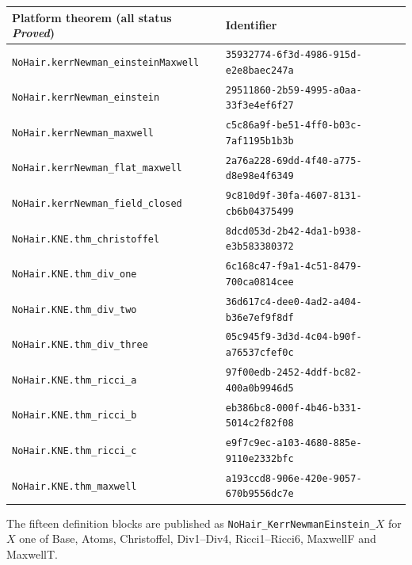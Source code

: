 \documentclass[11pt]{article}
\theoremstyle{definition}
\theoremstyle{remark}
\begin{document}
\begin{center}
\small
\begin{tabular}{@{}ll@{}}
\toprule
Platform theorem (all status \emph{Proved}) & Identifier \\
\midrule
\texttt{NoHair.kerrNewman\_einsteinMaxwell} & \texttt{35932774-6f3d-4986-915d-e2e8baec247a} \\
\texttt{NoHair.kerrNewman\_einstein} & \texttt{29511860-2b59-4995-a0aa-33f3e4ef6f27} \\
\texttt{NoHair.kerrNewman\_maxwell} & \texttt{c5c86a9f-be51-4ff0-b03c-7af1195b1b3b} \\
\texttt{NoHair.kerrNewman\_flat\_maxwell} & \texttt{2a76a228-69dd-4f40-a775-d8e98e4f6349} \\
\texttt{NoHair.kerrNewman\_field\_closed} & \texttt{9c810d9f-30fa-4607-8131-cb6b04375499} \\
\texttt{NoHair.KNE.thm\_christoffel} & \texttt{8dcd053d-2b42-4da1-b938-e3b583380372} \\
\texttt{NoHair.KNE.thm\_div\_one} & \texttt{6c168c47-f9a1-4c51-8479-700ca0814cee} \\
\texttt{NoHair.KNE.thm\_div\_two} & \texttt{36d617c4-dee0-4ad2-a404-b36e7ef9f8df} \\
\texttt{NoHair.KNE.thm\_div\_three} & \texttt{05c945f9-3d3d-4c04-b90f-a76537cfef0c} \\
\texttt{NoHair.KNE.thm\_ricci\_a} & \texttt{97f00edb-2452-4ddf-bc82-400a0b9946d5} \\
\texttt{NoHair.KNE.thm\_ricci\_b} & \texttt{eb386bc8-000f-4b46-b331-5014c2f82f08} \\
\texttt{NoHair.KNE.thm\_ricci\_c} & \texttt{e9f7c9ec-a103-4680-885e-9110e2332bfc} \\
\texttt{NoHair.KNE.thm\_maxwell} & \texttt{a193ccd8-906e-420e-9057-670b9556dc7e} \\
\bottomrule
\end{tabular}
\end{center}
The fifteen definition blocks are published as \texttt{NoHair\_KerrNewmanEinstein\_}$X$ for $X$ one of Base, Atoms, Christoffel, Div1--Div4, Ricci1--Ricci6, MaxwellF and MaxwellT.
\end{document}
